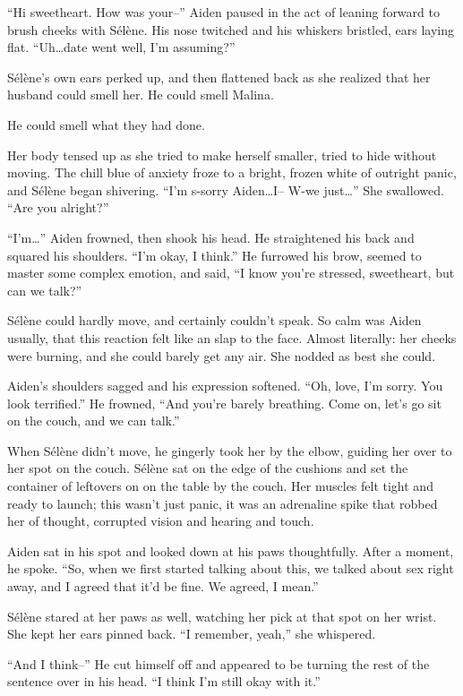 ``Hi sweetheart. How was your--'' Aiden paused in the act of leaning forward to brush cheeks with Sélène. His nose twitched and his whiskers bristled, ears laying flat. ``Uh\ldots{}date went well, I'm assuming?''

Sélène's own ears perked up, and then flattened back as she realized that her husband could smell her. He could smell Malina.

He could smell what they had done.

Her body tensed up as she tried to make herself smaller, tried to hide without moving. The chill blue of anxiety froze to a bright, frozen white of outright panic, and Sélène began shivering. ``I'm s-sorry Aiden\ldots{}I-- W-we just\ldots{}'' She swallowed. ``Are you alright?''

``I'm\ldots{}'' Aiden frowned, then shook his head. He straightened his back and squared his shoulders. ``I'm okay, I think.'' He furrowed his brow, seemed to master some complex emotion, and said, ``I know you're stressed, sweetheart, but can we talk?''

Sélène could hardly move, and certainly couldn't speak. So calm was Aiden usually, that this reaction felt like an slap to the face. Almost literally: her cheeks were burning, and she could barely get any air. She nodded as best she could.

Aiden's shoulders sagged and his expression softened. ``Oh, love, I'm sorry. You look terrified.'' He frowned, ``And you're barely breathing. Come on, let's go sit on the couch, and we can talk.''

When Sélène didn't move, he gingerly took her by the elbow, guiding her over to her spot on the couch. Sélène sat on the edge of the cushions and set the container of leftovers on on the table by the couch. Her muscles felt tight and ready to launch; this wasn't just panic, it was an adrenaline spike that robbed her of thought, corrupted vision and hearing and touch.

Aiden sat in his spot and looked down at his paws thoughtfully. After a moment, he spoke. ``So, when we first started talking about this, we talked about sex right away, and I agreed that it'd be fine. We agreed, I mean.''

Sélène stared at her paws as well, watching her pick at that spot on her wrist. She kept her ears pinned back. ``I remember, yeah,'' she whispered.

``And I think--'' He cut himself off and appeared to be turning the rest of the sentence over in his head. ``I think I'm still okay with it.''

